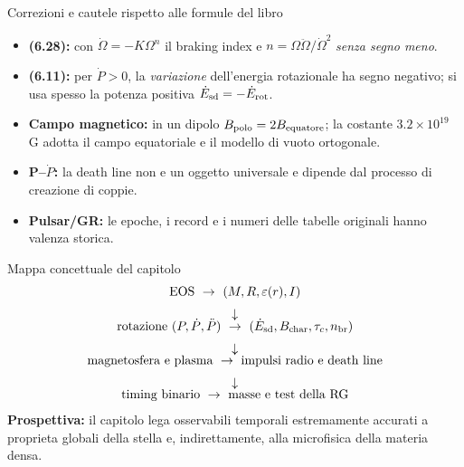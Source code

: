 \begin{frame}[t]{Correzioni e cautele rispetto alle formule del libro}
\small
\begin{itemize}
\item \textbf{(6.28):} con $\dot\Omega=-K\Omega^n$ il braking index e $n=\Omega\ddot\Omega/\dot\Omega^2$ \emph{senza segno meno}.
\item \textbf{(6.11):} per $\dot P>0$, la \emph{variazione} dell'energia rotazionale ha segno negativo; si usa spesso la potenza positiva $\dot E_{\rm sd}=-\dot E_{\rm rot}$.
\item \textbf{Campo magnetico:} in un dipolo $B_{\rm polo}=2B_{\rm equatore}$; la costante $3.2\times10^{19}$ G adotta il campo equatoriale e il modello di vuoto ortogonale.
\item \textbf{P--$\dot P$:} la death line non e un oggetto universale e dipende dal processo di creazione di coppie.
\item \textbf{Pulsar/GR:} le epoche, i record e i numeri delle tabelle originali hanno valenza storica.
\end{itemize}
\end{frame}

\begin{frame}[t]{Mappa concettuale del capitolo}
\small
\[
\begin{array}{c}
\text{EOS}\ \to\ (M,R,\varepsilon(r),I)\\[2mm]
\downarrow\\[-1mm]
\text{rotazione } (P,\dot P,\ddot P)
\ \to\ (\dot E_{\rm sd},B_{\rm char},\tau_c,n_{\rm br})\\[2mm]
\downarrow\\[-1mm]
\text{magnetosfera e plasma}\ \to\ \text{impulsi radio e death line}\\[2mm]
\downarrow\\[-1mm]
\text{timing binario}\ \to\ \text{masse e test della RG}
\end{array}
\]
\medskip
\textbf{Prospettiva:} il capitolo lega osservabili temporali estremamente accurati a proprieta globali della stella e, indirettamente, alla microfisica della materia densa.
\end{frame}

